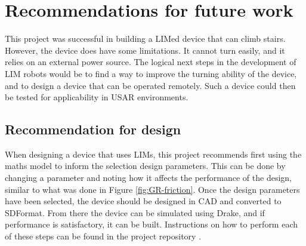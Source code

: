 \chapter{Recommendations for future work}

This project was successful in building a LIMed device that can climb stairs. However, the device does have some limitations. It cannot turn easily, and it relies on an external power source. The logical next steps in the development of LIM robots would be to find a way to improve the turning ability of the device, and to design a device that can be operated remotely. Such a device could then be tested for applicability in USAR environments.


\section{Recommendation for design}

When designing a device that uses LIMs, this project recommends first using the maths model to inform the selection design parameters. This can be done by changing a parameter and noting how it affects the performance of the design, similar to what was done in Figure \ref{fig:GR-friction}. Once the design parameters have been selected, the device should be designed in CAD and converted to SDFormat. From there the device can be simulated using Drake, and if performance is satisfactory, it can be built. Instructions on how to perform each of these steps can be found in the project repository \citep{repo}.\\
